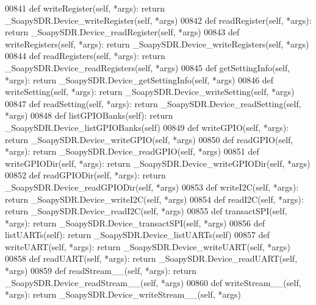 \begin{DoxyCode}
{{{{{00841     \textcolor{keyword}{def }writeRegister(self, *args): \textcolor{keywordflow}{return} \_SoapySDR.Device\_writeRegister(self, *args)
00842     \textcolor{keyword}{def }readRegister(self, *args): \textcolor{keywordflow}{return} \_SoapySDR.Device\_readRegister(self, *args)
00843     \textcolor{keyword}{def }writeRegisters(self, *args): \textcolor{keywordflow}{return} \_SoapySDR.Device\_writeRegisters(self, *args)
00844     \textcolor{keyword}{def }readRegisters(self, *args): \textcolor{keywordflow}{return} \_SoapySDR.Device\_readRegisters(self, *args)
00845     \textcolor{keyword}{def }getSettingInfo(self, *args): \textcolor{keywordflow}{return} \_SoapySDR.Device\_getSettingInfo(self, *args)
00846     \textcolor{keyword}{def }writeSetting(self, *args): \textcolor{keywordflow}{return} \_SoapySDR.Device\_writeSetting(self, *args)
00847     \textcolor{keyword}{def }readSetting(self, *args): \textcolor{keywordflow}{return} \_SoapySDR.Device\_readSetting(self, *args)
00848     \textcolor{keyword}{def }listGPIOBanks(self): \textcolor{keywordflow}{return} \_SoapySDR.Device\_listGPIOBanks(self)
00849     \textcolor{keyword}{def }writeGPIO(self, *args): \textcolor{keywordflow}{return} \_SoapySDR.Device\_writeGPIO(self, *args)
00850     \textcolor{keyword}{def }readGPIO(self, *args): \textcolor{keywordflow}{return} \_SoapySDR.Device\_readGPIO(self, *args)
00851     \textcolor{keyword}{def }writeGPIODir(self, *args): \textcolor{keywordflow}{return} \_SoapySDR.Device\_writeGPIODir(self, *args)
00852     \textcolor{keyword}{def }readGPIODir(self, *args): \textcolor{keywordflow}{return} \_SoapySDR.Device\_readGPIODir(self, *args)
00853     \textcolor{keyword}{def }writeI2C(self, *args): \textcolor{keywordflow}{return} \_SoapySDR.Device\_writeI2C(self, *args)
00854     \textcolor{keyword}{def }readI2C(self, *args): \textcolor{keywordflow}{return} \_SoapySDR.Device\_readI2C(self, *args)
00855     \textcolor{keyword}{def }transactSPI(self, *args): \textcolor{keywordflow}{return} \_SoapySDR.Device\_transactSPI(self, *args)
00856     \textcolor{keyword}{def }listUARTs(self): \textcolor{keywordflow}{return} \_SoapySDR.Device\_listUARTs(self)
00857     \textcolor{keyword}{def }writeUART(self, *args): \textcolor{keywordflow}{return} \_SoapySDR.Device\_writeUART(self, *args)
00858     \textcolor{keyword}{def }readUART(self, *args): \textcolor{keywordflow}{return} \_SoapySDR.Device\_readUART(self, *args)
00859     \textcolor{keyword}{def }readStream__(self, *args): \textcolor{keywordflow}{return} \_SoapySDR.Device\_readStream\_\_(self, *args)
00860     \textcolor{keyword}{def }writeStream__(self, *args): \textcolor{keywordflow}{return} \_SoapySDR.Device\_writeStream\_\_(self, *args)
}}}}}
\end{DoxyCode}
